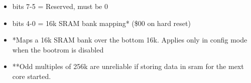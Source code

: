 \begin{itemize}
\item bits 7-5 = Reserved, must be 0
\item bits 4-0 = 16k SRAM bank mapping* (\$00 on hard reset)
\item[] *Maps a 16k SRAM bank over the bottom 16k. Applies only in
  config mode when the bootrom is disabled
\item[] **Odd multiples of 256k are unreliable if storing data in sram
  for the mext core started.
\end{itemize}

